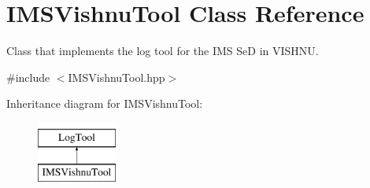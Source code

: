 \hypertarget{classIMSVishnuTool}{
\section{IMSVishnuTool Class Reference}
\label{classIMSVishnuTool}
}


Class that implements the log tool for the IMS SeD in VISHNU.  




{\ttfamily \#include $<$IMSVishnuTool.hpp$>$}

Inheritance diagram for IMSVishnuTool:\begin{figure}[H]
\begin{center}
\leavevmode
\includegraphics[height=2.000000cm]{classIMSVishnuTool}
\end{center}
\end{figure}
